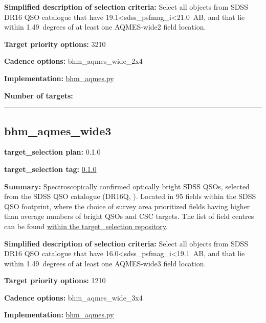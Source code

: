\noindent\textbf{Simplified description of selection criteria:} Select all
objects from SDSS DR16 QSO catalogue that have
19.1\textless sdss\_psfmag\_i\textless21.0~AB, and that lie within
1.49~degrees of at least one AQMES-wide2 field location.


\noindent\textbf{Target priority options:} 3210

\noindent\textbf{Cadence options:} bhm\_aqmes\_wide\_2x4

\noindent\textbf{Implementation:}
\href{https://github.com/sdss/target_selection/blob/0.1.0/python/target_selection/cartons/bhm_aqmes.py}{bhm\_aqmes.py}

\noindent\textbf{Number of targets:}

\begin{center}\rule{0.5\linewidth}{0.5pt}\end{center}

\hypertarget{bhm_aqmes_wide3_plan0.1.0}{%
\subsection{bhm\_aqmes\_wide3}\label{bhm_aqmes_wide3_plan0.1.0}}

\noindent\textbf{target\_selection plan:} 0.1.0

\noindent\textbf{target\_selection tag:}
\href{https://github.com/sdss/target_selection/tree/0.1.0/}{0.1.0}

\noindent\textbf{Summary:} Spectroscopically confirmed optically bright SDSS
QSOs, selected from the SDSS QSO catalogue (DR16Q,
\citealt{Lyke2020}). Located in 95 fields within the SDSS QSO footprint,
where the choice of survey area prioritized fields having higher than
average numbers of bright QSOs and CSC targets. The list of field
centres can be found
\href{https://github.com/sdss/target_selection/blob/0.1.0/python/target_selection/masks/candidate_target_fields_bhm_aqmes_wide_v0.2.1.fits}{within
the target\_selection repository}.

\noindent\textbf{Simplified description of selection criteria:} Select all
objects from SDSS DR16 QSO catalogue that have
16.0\textless sdss\_psfmag\_i\textless19.1~AB, and that lie within
1.49~degrees of at least one AQMES-wide3 field location.


\noindent\textbf{Target priority options:} 1210

\noindent\textbf{Cadence options:} bhm\_aqmes\_wide\_3x4

\noindent\textbf{Implementation:}
\href{https://github.com/sdss/target_selection/blob/0.1.0/python/target_selection/cartons/bhm_aqmes.py}{bhm\_aqmes.py}

